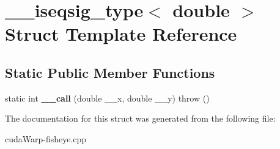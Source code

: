 \hypertarget{struct____iseqsig__type_3_01double_01_4}{}\section{\+\_\+\+\_\+iseqsig\+\_\+type$<$ double $>$ Struct Template Reference}
\label{struct____iseqsig__type_3_01double_01_4}
\subsection*{Static Public Member Functions}
\begin{DoxyCompactItemize}
\item 
static int {\bfseries \+\_\+\+\_\+call} (double \+\_\+\+\_\+x, double \+\_\+\+\_\+y)  throw ()\hypertarget{struct____iseqsig__type_3_01double_01_4_a592203442eb045a655b37e5a5785df54}{}\label{struct____iseqsig__type_3_01double_01_4_a592203442eb045a655b37e5a5785df54}

\end{DoxyCompactItemize}


The documentation for this struct was generated from the following file\+:\begin{DoxyCompactItemize}
\item 
cuda\+Warp-\/fisheye.\+cpp\end{DoxyCompactItemize}
